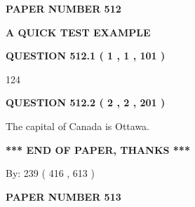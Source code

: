 \documentclass[12pt]{article}
\begin{document}
   
   
   
\newpage 
\setcounter{page}{ 
   512001 } 
   
   
   
   
 {\textbf{ \Large{ PAPER NUMBER  512  }}}
   
   
\vspace{0.2in}
   
   
   
   
   
   
 \vspace{0.2in}
{\LARGE {\textbf{ A QUICK TEST EXAMPLE}}}
   
   
  
\vspace{0.2in}
  
{\textbf{\Large{QUESTION
512.1 
 ( 1 , 1 , 101 )
}}}
  
  
 
 
\noindent{}

124
 
 
  
\vspace{0.2in}
  
{\textbf{\Large{QUESTION
512.2 
 ( 2 , 2 , 201 )
}}}
  
  
 
 
\noindent{}
 
 
The capital of Canada is Ottawa.
 
 
 
 
   
   
 \vspace{0.2in}
 
   
   
   
   
\vspace{1.0in} 
{\textbf{\large{ *** END OF PAPER, THANKS *** }}} 
   
   
\hspace{1.0in} By: 
 239 ( 416 ,  613 )
   
   
   
   
\newpage 
\setcounter{page}{ 
   513001 } 
   
   
   
   
 {\textbf{ \Large{ PAPER NUMBER  513  }}}
   
\end{document}
